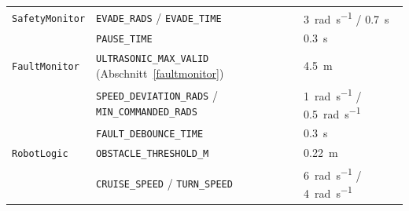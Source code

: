 \documentclass[
  a4paper,
  12pt,
  DIV=12,        %
  parskip=half,  %
  headings=small %
]{scrartcl}
\theoremstyle{definition}
\theoremstyle{definition}
\begin{document}
\begin{longtable}[]{@{}p{}p{}p{}@{}}
\texttt{SafetyMonitor} & \texttt{EVADE\_RADS} / \texttt{EVADE\_TIME} & \SI{3}{\radian\per\second} / \SI{0.7}{\second}\\
 & \texttt{PAUSE\_TIME} & \SI{0.3}{\second}\\
\texttt{FaultMonitor} & \texttt{ULTRASONIC\_MAX\_VALID} (Abschnitt~\ref{faultmonitor}) & \SI{4.5}{\meter}\\
 & \texttt{SPEED\_DEVIATION\_RADS} / \texttt{MIN\_COMMANDED\_RADS} & \SI{1}{\radian\per\second} / \SI{0.5}{\radian\per\second}\\
 & \texttt{FAULT\_DEBOUNCE\_TIME} & \SI{0.3}{\second}\\
\texttt{RobotLogic} & \texttt{OBSTACLE\_THRESHOLD\_M} & \SI{0.22}{\meter}\\
 & \texttt{CRUISE\_SPEED} / \texttt{TURN\_SPEED} & \SI{6}{\radian\per\second} / \SI{4}{\radian\per\second}\\
\bottomrule
\end{longtable}
\end{document}
